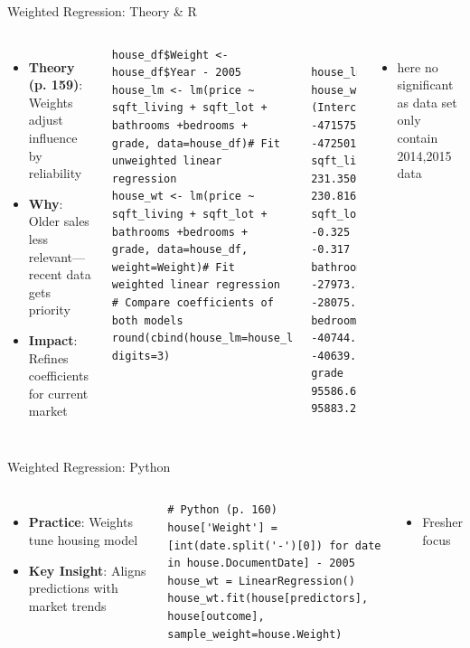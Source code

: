 \documentclass{beamer}
\begin{document}
	\begin{frame}[fragile]{Weighted Regression: Theory \& R}
		\begin{columns}
			\begin{itemize}
				\item \textbf{Theory (p. 159)}: Weights adjust influence by reliability
				\item \textbf{Why}: Older sales less relevant—recent data gets priority
				\item \textbf{Impact}: Refines coefficients for current market
			\end{itemize}
			\begin{lstlisting}
house_df$Weight <- house_df$Year - 2005
house_lm <- lm(price ~ sqft_living + sqft_lot + bathrooms +bedrooms + grade, data=house_df)# Fit unweighted linear regression
house_wt <- lm(price ~ sqft_living + sqft_lot + bathrooms +bedrooms + grade, data=house_df, weight=Weight)# Fit weighted linear regression
# Compare coefficients of both models
round(cbind(house_lm=house_lm$coefficients,house_wt=house_wt$coefficients), digits=3)
			\end{lstlisting}
			\begin{lstlisting}
               house_lm    house_wt
(Intercept) -471575.692 -472501.632
sqft_living     231.350     230.816
sqft_lot         -0.325      -0.317
bathrooms    -27973.439  -28075.162
bedrooms     -40744.142  -40639.355
grade         95586.697   95883.234
\end{lstlisting}
	\begin{itemize}
	\item here no significant as data set only contain 2014,2015 data
\end{itemize}
		\end{columns}
	\end{frame}
	
	\begin{frame}[fragile]{Weighted Regression: Python}
		\lstset{language=Python}
		\begin{columns}
			\column{0.6\textwidth}
			\begin{itemize}
				\item \textbf{Practice}: Weights tune housing model
				\item \textbf{Key Insight}: Aligns predictions with market trends
			\end{itemize}
			\begin{lstlisting}
# Python (p. 160)
house['Weight'] = [int(date.split('-')[0]) for date in house.DocumentDate] - 2005
house_wt = LinearRegression()
house_wt.fit(house[predictors], house[outcome], sample_weight=house.Weight)
			\end{lstlisting}
			\column{0.4\textwidth}
			\begin{itemize}
				\item Fresher focus
			\end{itemize}
		\end{columns}
	\end{frame}
	
\end{document}

